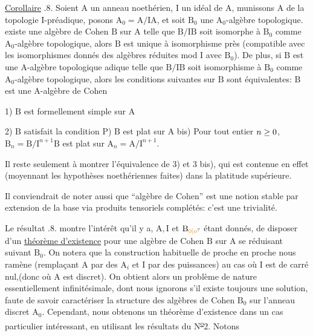 \uline{Corollaire} .8. Soient $\mathrm A$ un anneau  noethérien, $\mathrm I$ un idéal de $\mathrm A$, munissons $\mathrm A$ de la topologie $\mathrm I$-préadique, posons $\mathrm A_0=\mathrm A/\mathrm{IA}$, et soit $\mathrm B_0$ une $\mathrm A_0$-algèbre topologique.  existe une algèbre de Cohen $\mathrm B$ sur $\mathrm A$ telle que $\mathrm B/\mathrm{IB}$ soit isomorphe à $\mathrm B_0$ comme $\mathrm A_0$-algèbre topologique, alors $\mathrm B$ est unique à  isomorphisme près  (compatible avec les isomorphismes donnés des algèbres  réduites mod $\mathrm I$ avec $\mathrm B_0$). De plus, si $\mathrm B$ est une $\mathrm A$-algèbre topologique adique telle que $\mathrm B/\mathrm{IB}$ soit isomorphisme à $\mathrm B_0$ comme $\mathrm A_0$-algèbre topologique, alors les conditions suivantes sur $\mathrm B$ sont équivalentes:  $\mathrm B$ est une $\mathrm A$-algèbre de Cohen

1) $\mathrm B$ est formellement simple sur $\mathrm A$

2) $\mathrm B$ satisfait la condition $\mathrm P$) $\mathrm B$ est plat sur $\mathrm A$ bis) Pour tout entier $n\geq0$, $\mathrm B_n=\mathrm B/\mathrm I^{n+1}\mathrm B$ est plat sur $\mathrm A_n=\mathrm A/\mathrm I^{n+1}$. 

Il reste seulement à montrer l'équivalence de 3) et 3 bis), qui est contenue en effet (moyennant les hypothèses noethériennes faites) dans la platitude supérieure.

 Il conviendrait de noter aussi que ``algèbre de Cohen'' est une notion stable par extension de la base via produits tensoriels complétés: c'est une trivialité.

Le résultat .8. montre l'intérêt qu'il y a, $\mathrm A,\mathrm I$ et $\mathrm B_{\unsure{0|o}}$ étant donnés, de disposer d'un \uline{théorème d'existence} pour une algèbre de Cohen $\mathrm B$ sur $\mathrm A$ se réduisant suivant $\mathrm B_0$. On notera que la construction habituelle de proche en proche nous ramène (remplaçant $\mathrm A$ par des $\mathrm A_i$ et $\mathrm I$ par des puissances) au cas où $\mathrm I$ est de carré nul,(donc où $\mathrm A$ est discret). On obtient alors un problème de nature essentiellement infinitésimale, dont nous ignorons s'il existe toujours une solution, faute de savoir caractériser la structure des algèbres de Cohen $\mathrm B_0$ sur l'anneau discret $\mathrm A_0$. Cependant, nous obtenons  un théorème d'existence dans un cas particulier intéressant, en utilisant les résultats du N\textsuperscript{\uline{o}}2\deleted{\unsure{,}}. Notons 

